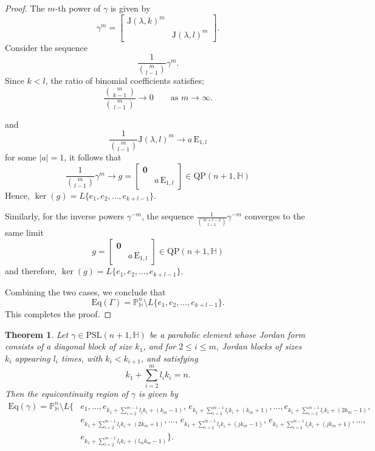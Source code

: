 \documentclass[12pt,reqno]{amsart}
\numberwithin{equation}{section}
\newtheorem{theorem}{Theorem}[section]
\theoremstyle{definition}
\def\H{\mathbb H}
\def\P{\mathbb P}
\def\H{\mathbb {H}}
\begin{document}
\begin{proof}
The $m$-th power of $\gamma$ is given by
\[
\gamma^m =
\begin{bmatrix}
    \mathrm{J}(\lambda, k)^m & \\
    & \mathrm{J}(\lambda, l)^m
\end{bmatrix}.
\]
Consider the sequence
\[
\frac{1}{{m \choose l - 1}} \gamma^m.
\]
Since \(k < l\), the ratio of binomial coefficients satisfies;
\[
\frac{\binom{m}{\,k-1\,}}{\binom{m}{\,l-1\,}} \longrightarrow 0 
\qquad \text{as } m \to \infty.
\]

and 
\[
\frac{1}{{m \choose l - 1}} \mathrm{J}(\lambda, l)^m \longrightarrow a\,\mathrm{E}_{1,l}
\]
for some $|a| = 1$, it follows that
\[
\frac{1}{{m \choose l - 1}} \gamma^m \longrightarrow
g =
\begin{bmatrix}
    \mathbf{0} & \\
    & a\,\mathrm{E}_{1,l}
\end{bmatrix}  \in \mathrm{QP}(n+1,\mathbb{H})
\]
Hence,
$\ker(g) = L\{ e_1, e_2, \ldots, e_{k+l-1} \}.$


Similarly, for the inverse powers $\gamma^{-m}$, the sequence
$\frac{1}{{m + l - 2 \choose l - 1}} \gamma^{-m}$
converges to the same limit
\[
g =
\begin{bmatrix}
    \mathbf{0} & \\
    & a\,\mathrm{E}_{1,l}
\end{bmatrix} \in \mathrm{QP}(n+1,\mathbb{H})
\]
and therefore,
$\ker(g) = L\{ e_1, e_2, \ldots, e_{k+l-1} \}.$


Combining the two cases, we conclude that
\[
\mathrm{Eq}(\Gamma) =  \P^n_\H\setminus L\{ e_1, e_2, \ldots, e_{k+l-1} \} .
\]
This completes the proof. 
\end{proof}

\begin{theorem}
\label{th:par-main}
Let $\gamma \in \mathrm{PSL}(n+1, \mathbb{H})$ be a parabolic element whose Jordan form consists of 
a diagonal block of size $k_1$, and for $2 \le i \le m$, Jordan blocks of sizes $k_i$ appearing 
$l_i$ times, with $k_i < k_{i+1}$, and satisfying
\[
k_1 + \sum_{i=2}^{m} l_i k_i = n.
\]
Then the equicontinuity region of $\gamma$ is given by
\begin{align*}
\mathrm{Eq}(\gamma) = \P^n_\H\setminus L\Big\{
& e_1, \ldots, 
e_{k_1 + \sum_{i=2}^{m-1} l_i k_i + (k_m - 1)}, \,
e_{k_1 + \sum_{i=2}^{m-1} l_i k_i + (k_m + 1)}, \ldots,
e_{k_1 + \sum_{i=2}^{m-1} l_i k_i + (2k_m - 1)}, \, \\
& e_{k_1 + \sum_{i=2}^{m-1} l_i k_i + (2k_m + 1)}, \ldots, \,
e_{k_1 + \sum_{i=2}^{m-1} l_i k_i + (j k_m - 1)}, \,
e_{k_1 + \sum_{i=2}^{m-1} l_i k_i + (j k_m + 1)}, \ldots, \\
& e_{k_1 + \sum_{i=2}^{m-1} l_i k_i + (l_m k_m - 1)}
\Big\}.
\end{align*}
\end{theorem}
\end{document}
